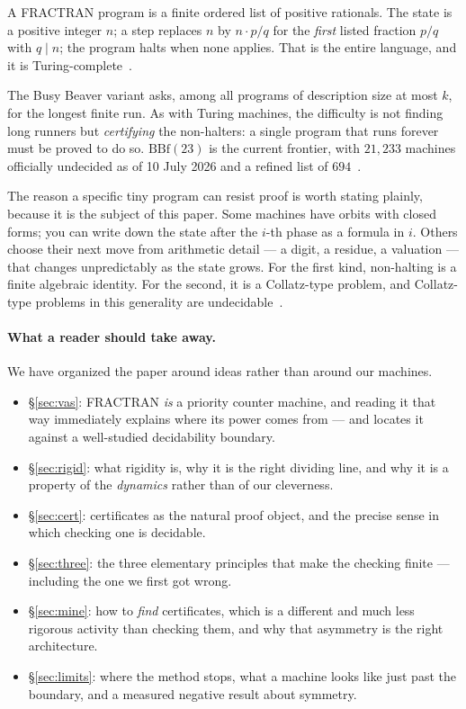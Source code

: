 \documentclass[11pt,a4paper]{article}
\theoremstyle{plain}
\theoremstyle{definition}
\begin{document}
A FRACTRAN program is a finite ordered list of positive rationals. The
state is a positive integer $n$; a step replaces $n$ by $n \cdot p/q$ for
the \emph{first} listed fraction $p/q$ with $q \mid n$; the program halts
when none applies. That is the entire language, and it is
Turing-complete~\cite{conway1987}.

The Busy Beaver variant asks, among all programs of description size at
most $k$, for the longest finite run. As with Turing machines, the
difficulty is not finding long runners but \emph{certifying} the
non-halters: a single program that runs forever must be proved to do so.
$\mathrm{BBf}(23)$ is the current frontier, with $21{,}233$ machines
officially undecided as of 10 July 2026 and a refined list of
$694$~\cite{bbfractran}.

The reason a specific tiny program can resist proof is worth stating
plainly, because it is the subject of this paper. Some machines have
orbits with closed forms; you can write down the state after the $i$-th
phase as a formula in $i$. Others choose their next move from arithmetic
detail --- a digit, a residue, a valuation --- that changes
unpredictably as the state grows. For the first kind, non-halting is a
finite algebraic identity. For the second, it is a Collatz-type problem,
and Collatz-type problems in this generality are
undecidable~\cite{conway1972,kurtzsimon}.

\paragraph{What a reader should take away.} We have organized the paper
around ideas rather than around our machines.

\begin{itemize}
\item \S\ref{sec:vas}: FRACTRAN \emph{is} a priority counter machine, and
  reading it that way immediately explains where its power comes from ---
  and locates it against a well-studied decidability boundary.
\item \S\ref{sec:rigid}: what rigidity is, why it is the right dividing
  line, and why it is a property of the \emph{dynamics} rather than of
  our cleverness.
\item \S\ref{sec:cert}: certificates as the natural proof object, and the
  precise sense in which checking one is decidable.
\item \S\ref{sec:three}: the three elementary principles that make the
  checking finite --- including the one we first got wrong.
\item \S\ref{sec:mine}: how to \emph{find} certificates, which is a
  different and much less rigorous activity than checking them, and why
  that asymmetry is the right architecture.
\item \S\ref{sec:limits}: where the method stops, what a machine looks
  like just past the boundary, and a measured negative result about
  symmetry.
\end{itemize}
\end{document}
